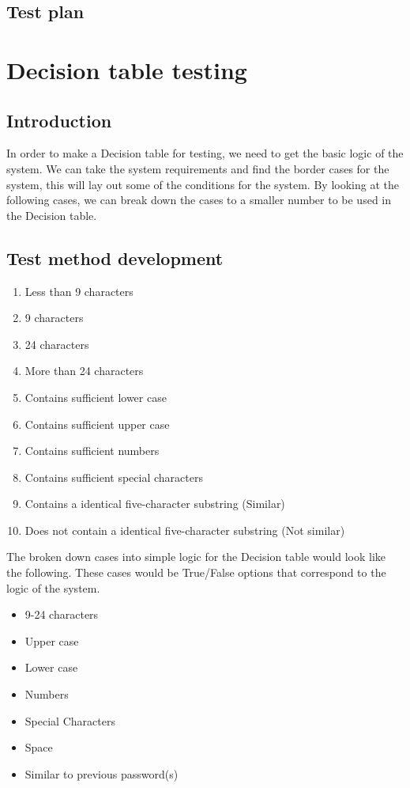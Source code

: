 \documentclass[12pt,letterpaper]{article}
\begin{document}
\subsection{Test plan}


\section{Decision table testing}

\subsection{Introduction}

In order to make a Decision table for testing, we need to get the basic logic of the system.
We can take the system requirements and find the border cases for the system, this will lay
out some of the conditions for the system. By looking at the following cases, we
can break down the cases to a smaller number to be used in the Decision table.

\subsection{Test method development}

\begin{enumerate}
\item Less than 9 characters
\item 9 characters
\item 24 characters
\item More than 24 characters
\item Contains sufficient lower case
\item Contains sufficient upper case
\item Contains sufficient numbers
\item Contains sufficient special characters
\item Contains a identical five-character substring (Similar)
\item Does not contain a identical five-character substring (Not similar)
\end{enumerate}

The broken down cases into simple logic for the Decision table would look like the following.
These cases would be True/False options that correspond to the logic of the system.

\begin{itemize}
\item 9-24 characters
\item Upper case
\item Lower case
\item Numbers
\item Special Characters
\item Space
\item Similar to previous password(s)
\end{itemize}
\end{document}
